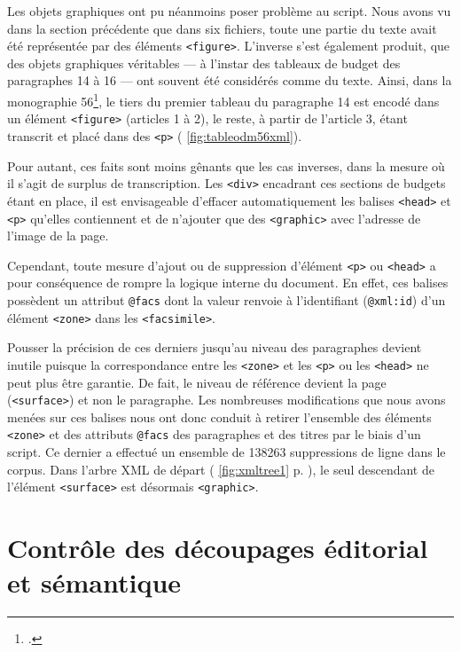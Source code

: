 Les objets graphiques ont pu néanmoins poser problème au script. Nous avons vu dans la section précédente que dans six fichiers, toute une partie du texte avait été représentée par des éléments \texttt{<figure>}. L'inverse s'est également produit, \cad{} que des objets graphiques véritables --- à l'instar des tableaux de budget des paragraphes 14 à 16 --- ont souvent été considérés comme du texte. Ainsi, dans la monographie \no{}56\footcite{mono056a}, le tiers du premier tableau du paragraphe 14 est encodé dans un élément \texttt{<figure>} (articles 1 à 2), le reste, à partir de l'article 3, étant transcrit et placé dans des \texttt{<p>} (\fig{} \ref{fig:tableodm56xml}).

Pour autant, ces faits sont moins gênants que les cas inverses, dans la mesure où il s'agit de surplus de transcription. Les \texttt{<div>} encadrant ces sections de budgets étant en place, il est envisageable d'effacer automatiquement les balises \texttt{<head>} et \texttt{<p>} qu'elles contiennent et de n'ajouter que des \texttt{<graphic>} avec l'adresse de l'image de la page.

Cependant, toute mesure d'ajout ou de suppression d'élément \texttt{<p>} ou \texttt{<head>} a pour conséquence de rompre la logique interne du document. En effet, ces balises possèdent un attribut \texttt{@facs} dont la valeur renvoie à l'identifiant (\texttt{@xml:id}) d'un élément \texttt{<zone>} dans les \texttt{<facsimile>}.

Pousser la précision de ces derniers jusqu'au niveau des paragraphes devient inutile puisque la correspondance entre les \texttt{<zone>} et les \texttt{<p>} ou les \texttt{<head>} ne peut plus 
être garantie. De fait, le niveau de référence devient la page (\texttt{<surface>}) et non le paragraphe. Les nombreuses modifications que nous avons menées sur ces balises nous ont donc conduit à retirer l'ensemble des éléments \texttt{<zone>} et des attributs \texttt{@facs} des paragraphes et des titres par le biais d'un script. Ce dernier a effectué un ensemble de 138263 suppressions de ligne dans le corpus. Dans l'arbre XML de départ (\fig{} \ref{fig:xmltree1} p. \pageref{fig:xmltree1}), le seul descendant de l'élément \texttt{<surface>} est désormais \texttt{<graphic>}.

\newpage
\thispagestyle{empty}
\mbox{}
\newpage

\chapter[Découpages éditorial et sémantique]{Contrôle des découpages éditorial et sémantique}

